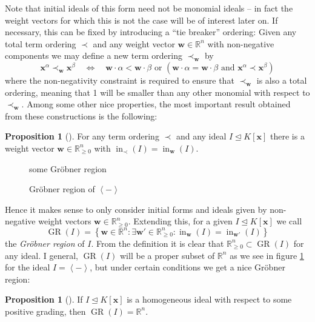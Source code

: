 \documentclass[
  paper=a4,
  titlepage,
  bibliography=totoc,
  listof=totoc,
  pagesize=pdftex
]{scrartcl}
\numberwithin{figure}{section}
\numberwithin{equation}{section}
\numberwithin{table}{section}
\newcommand*\setR{\mathds{R}}
\newcommand*\ideal[1]{\left\langle #1 \right\rangle}
\let\vec\mathbf
\let\idealof\trianglelefteq
\DeclareMathOperator{\initial}{in}
\DeclareMathOperator{\GR}{GR}
\theoremstyle{definition}
\newtheorem{proposition}[definition]{Proposition}
\numberwithin{definition}{section}
\begin{document}
Note that initial ideals of this form need not be monomial ideals -- in fact the weight
vectors for which this is not the case will be of interest later on. If necessary, this
can be fixed by introducing a \enquote{tie breaker} ordering: Given any total term
ordering $\prec$ and any weight vector $\vec w\in\setR^n$ with non-negative components we
may define a new term ordering $\prec_{\vec w}$ by
\[
  \vec x^\alpha \prec_{\vec w} \vec x^\beta
  \quad\iff\quad
  \vec w \cdot \alpha < \vec w\cdot \beta
  \text{ or }
  \left(
    \vec w \cdot \alpha = \vec w\cdot \beta
    \text{ and }
    \vec x^\alpha \prec \vec x^\beta
  \right)
\]
where the non-negativity constraint is required to ensure that $\prec_{\vec w}$ is also a
total ordering, meaning that 1 will be smaller than any other monomial with respect to
$\prec_{\vec w}$. Among some other nice properties, the most important result obtained
from these constructions is the following:

\begin{proposition}[{\cite[Proposition~1.11]{SturmGBCP}}]
  For any term ordering $\prec$ and any ideal $I \idealof K[\vec x]$ there is a weight
  vector $\vec w \in \setR^n_{\geq0}$ with $\initial_\prec(I) = \initial_{\vec w}(I)$.
\end{proposition}

\begin{figure}[tbh]
  \centering
  some Gröbner region
  \caption{Gröbner region of $\ideal{-}$}
  \label{fig:gr}
\end{figure}

Hence it makes sense to only consider initial forms and ideals given by non-negative
weight vectors $\vec w \in \setR^n_{\geq0}$. Extending this, for a given $I \idealof
K[\vec x]$ we call
\[
  \GR(I) = \left\{
    \vec w \in \setR^n : \exists \vec w' \in \setR^n_{\geq0} :
    \initial_{\vec w}(I) = \initial_{\vec w'}(I)
  \right\}
\]
the \emph{Gröbner region} of $I$. From the definition it is clear that $\setR^n_{\geq0}
\subset \GR(I)$ for any ideal. I general, $\GR(I)$ will be a proper subset of $\setR^n$ as
we see in figure \ref{fig:gr} for the ideal $I=\ideal{-}$, but under certain conditions we
get a nice Gröbner region:

\begin{proposition}[{\cite[Proposition~1.12]{SturmGBCP}}]
  If $I \idealof K[\vec x]$ is a homogeneous ideal with respect to some positive grading,
  then $\GR(I) = \setR^n$.
\end{proposition}
\end{document}
